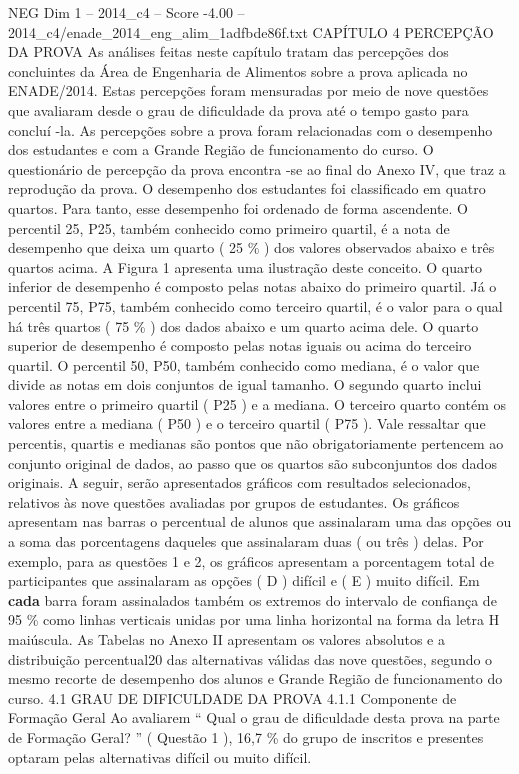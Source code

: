 \begin{textsample}{NEG Dim 1 – 2014\_c4 – Score -4.00 – 2014\_c4/enade\_2014\_eng\_alim\_1adfbde86f.txt}  \label{ex:f1_neg_129}
CAPÍTULO 4 PERCEPÇÃO DA PROVA As análises feitas neste capítulo tratam das percepções dos concluintes da Área de Engenharia de Alimentos sobre a prova aplicada no ENADE/2014.
Estas percepções foram mensuradas por meio de nove questões que avaliaram desde o grau de dificuldade da prova até o tempo gasto para concluí -la.
As percepções sobre a prova foram relacionadas com o desempenho dos estudantes e com a Grande Região de funcionamento do curso.
O questionário de percepção da prova encontra -se ao final do Anexo IV, que traz a reprodução da prova.
O desempenho dos estudantes foi classificado em quatro quartos.
Para tanto, esse desempenho foi ordenado de forma ascendente.
O percentil 25, P25, também conhecido como primeiro quartil, é a nota de desempenho que deixa um quarto ( 25 \% ) dos valores observados abaixo e três quartos acima.
A Figura 1 apresenta uma ilustração deste conceito.
O quarto inferior de desempenho é composto pelas notas abaixo do primeiro quartil.
Já o percentil 75, P75, também conhecido como terceiro quartil, é o valor para o qual há três quartos ( 75 \% ) dos dados abaixo e um quarto acima dele.
O quarto superior de desempenho é composto pelas notas iguais ou acima do terceiro quartil.
O percentil 50, P50, também conhecido como mediana, é o valor que divide as notas em dois conjuntos de igual tamanho.
O segundo quarto inclui valores entre o primeiro quartil ( P25 ) e a mediana.
O terceiro quarto contém os valores entre a mediana ( P50 ) e o terceiro quartil ( P75 ).
Vale ressaltar que percentis, quartis e medianas são pontos que não obrigatoriamente pertencem ao conjunto original de dados, ao passo que os quartos são subconjuntos dos dados originais.
A seguir, serão apresentados gráficos com resultados selecionados, relativos às nove questões avaliadas por grupos de estudantes.
Os gráficos apresentam nas barras o percentual de alunos que assinalaram uma das opções ou a soma das porcentagens daqueles que assinalaram duas ( ou três ) delas.
Por exemplo, para as questões 1 e 2, os gráficos apresentam a porcentagem total de participantes que assinalaram as opções ( D ) difícil e ( E ) muito difícil.
Em \textbf{cada} barra foram assinalados também os extremos do intervalo de confiança de 95 \% como linhas verticais unidas por uma linha horizontal na forma da letra H maiúscula.
As Tabelas no Anexo II apresentam os valores absolutos e a distribuição percentual20 das alternativas válidas das nove questões, segundo o mesmo recorte de desempenho dos alunos e Grande Região de funcionamento do curso. 4.1 GRAU DE DIFICULDADE DA PROVA 4.1.1 Componente de Formação Geral Ao avaliarem “ Qual o grau de dificuldade desta prova na parte de Formação Geral? ” ( Questão 1 ), 16,7 \% do grupo de inscritos e presentes optaram pelas alternativas difícil ou muito difícil.

\end{textsample}
